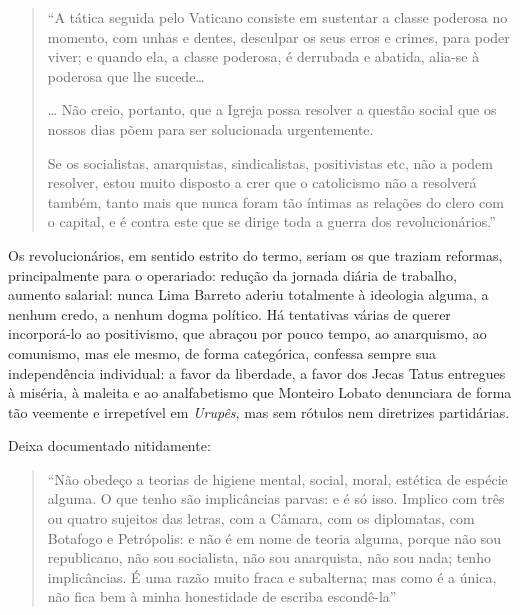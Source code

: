\documentclass[
  letterpaper,
  DIV=11,
  numbers=noendperiod]{scrreprt}
\begin{document}
\begin{quote}
``A tática seguida pelo Vaticano consiste em sustentar a classe poderosa
no momento, com unhas e dentes, desculpar os seus erros e crimes, para
poder viver; e quando ela, a classe poderosa, é derrubada e abatida,
alia-se à poderosa que lhe sucede\ldots{}

\ldots{} Não creio, portanto, que a Igreja possa resolver a questão
social que os nossos dias põem para ser solucionada urgentemente.

Se os socialistas, anarquistas, sindicalistas, positivistas etc, não a
podem resolver, estou muito disposto a crer que o catolicismo não a
resolverá também, tanto mais que nunca foram tão íntimas as relações do
clero com o capital, e é contra este que se dirige toda a guerra dos
revolucionários.''
\end{quote}

Os revolucionários, em sentido estrito do termo, seriam os que traziam
reformas, principalmente para o operariado: redução da jornada diária de
trabalho, aumento salarial: nunca Lima Barreto aderiu totalmente à
ideologia alguma, a nenhum credo, a nenhum dogma político. Há tentativas
várias de querer incorporá-lo ao positivismo, que abraçou por pouco
tempo, ao anarquismo, ao comunismo, mas ele mesmo, de forma categórica,
confessa sempre sua independência individual: a favor da liberdade, a
favor dos Jecas Tatus entregues à miséria, à maleita e ao analfabetismo
que Monteiro Lobato denunciara de forma tão veemente e irrepetível em
\emph{Urupês}, mas sem rótulos nem diretrizes partidárias.

Deixa documentado nitidamente:

\begin{quote}
``Não obedeço a teorias de higiene mental, social, moral, estética de
espécie alguma. O que tenho são implicâncias parvas: e é só isso.
Implico com três ou quatro sujeitos das letras, com a Câmara, com os
diplomatas, com Botafogo e Petrópolis: e não é em nome de teoria alguma,
porque não sou republicano, não sou socialista, não sou anarquista, não
sou nada; tenho implicâncias. É uma razão muito fraca e subalterna; mas
como é a única, não fica bem à minha honestidade de escriba escondê-la''
\end{quote}
\end{document}

